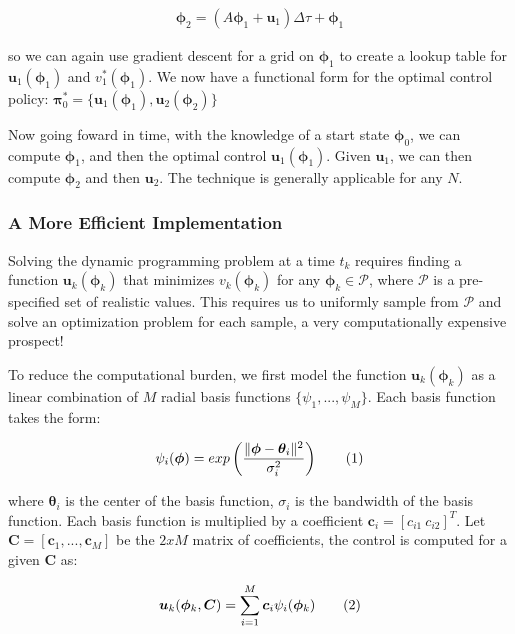 \documentclass{article} %
\newcommand\numberthis{\addtocounter{equation}{1}\tag{\theequation}}
\begin{document}
\begin{align*}
\bm{\phi}_2 = \left( A\bm{\phi}_1 + \bm{u}_1 \right) \Delta\tau + \bm{\phi}_1
\end{align*}

so we can again use gradient descent for a grid on $\bm{\phi}_1$ to create a lookup
table for $\bm{u}_1(\bm{\phi}_1)$ and $v^*_1 \left( \bm{\phi}_1 \right)$. We now have
a functional form for the optimal control policy: $\bm{\pi}_0^* = \{ \bm{u}_1(\bm{\phi}_1), \bm{u}_2(\bm{\phi}_2) \}$

Now going foward in time, with the knowledge of a start state $\bm{\phi}_0$, we can 
compute $\bm{\phi}_1$, and then the optimal control $\bm{u}_1 \left( \bm{\phi}_1 \right)$.
Given $\bm{u}_1$, we can then compute $\bm{\phi}_2$ and then $\bm{u}_2$. The technique
is generally applicable for any $N$.


\subsubsection{A More Efficient Implementation}
\label{section_implementation}

Solving the dynamic programming problem at a time $t_k$ requires finding a function
$\bm{u}_k(\bm{\phi}_k)$ that minimizes $v_k(\bm{\phi}_k)$ for any
$\bm{\phi}_k \in \mathcal{P}$, where $\mathcal{P}$ is a pre-specified
set of realistic values. This requires us to uniformly
sample from $\mathcal{P}$ and solve an optimization problem for each sample, a
very computationally expensive prospect!

To reduce the computational burden, we first model the function $\bm{u}_k(\bm{\phi}_k)$
as a linear combination of $M$ radial basis functions
$\{ \psi_1, ..., \psi_M \}$. Each basis function takes the form:

\begin{align*}
\psi_i(\bm{\phi}) = exp \left( \frac{\| \bm{\phi} - \bm{\theta}_i \| ^2 }{\sigma_i ^2} \right) \numberthis \label{eq_rbf} 
\end{align*}

where $\bm{\theta}_i$ is the center of the basis function, $\sigma_i$ is the bandwidth of
the basis function. Each basis function is multiplied by a coefficient
$\bm{c}_i = \left[ c_{i1} ~ c_{i2} \right]^T$. Let $\bm{C}=\left[ \bm{c}_1, ... ,\bm{c}_M \right]$
be the $2xM$ matrix of coefficients, the control is computed for a given $\bm{C}$ as:

\begin{align*}
\bm{u}_k(\bm{\phi}_k, \bm{C}) = \sum_{i=1}^M \bm{c}_i \psi_i(\bm{\phi}_k)  \numberthis \label{eq_u_rbf}
\end{align*}
\end{document}

